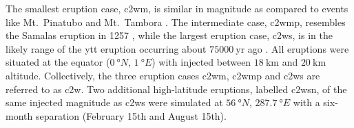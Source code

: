 \documentclass{ametsocV6.1}
\newcommand{\iso}[1][i]{{#1}njected \ce{SO2}}
\begin{document}
The smallest eruption case, \gls{c2wm}, is similar in magnitude as compared to events
like Mt.\ Pinatubo
\citep[\(\sim10\)--\(\SI{20}{\tera\gram(\ce{SO2})}\);][]{timmreck2018} and Mt.\ Tambora
\citep[\(\sim\SI{56.2}{\tera\gram(\ce{SO2})}\);][]{zanchettin2016}. The intermediate
case, \gls{c2wmp}, resembles the Samalas eruption in 1257
\citep[\(\sim{144}\)--\(\SI{170}{\tera\gram(\ce{SO2})}\);][]{vidal2016}, while the
largest eruption case, \gls{c2ws}, is in the likely range of the \gls{ytt} eruption
occurring about \(\SI{75000}{\mathrm{yr}}\) ago
\citep[\(100\)--\(\SI{10000}{\tera\gram(\ce{SO2})}\);][]{jones2005}. All eruptions were
situated at the equator (\(\SI{0}{\degree N}\), \(\SI{1}{\degree E}\)) with 
injected between \(\SI{18}{\kilo\meter}\) and \(\SI{20}{\kilo\meter}\) altitude.
Collectively, the three eruption cases \gls{c2wm}, \gls{c2wmp} and \gls{c2ws} are
referred to as \gls{c2w}. Two additional high-latitude eruptions, labelled \gls{c2wsn},
of the same \iso{} magnitude as \gls{c2ws} were simulated at \(\SI{56}{\degree N}\),
\(\SI{287.7}{\degree E}\) with a six-month separation (February 15th and August 15th).
\end{document}
